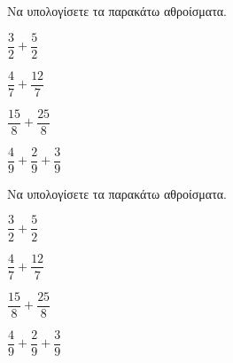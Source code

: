 Να υπολογίσετε τα παρακάτω αθροίσματα.
\begin{multicols}{2}
\begin{rlist}
\item $ \dfrac{3}{2}+\dfrac{5}{2} $
\item $ \dfrac{4}{7}+\dfrac{12}{7} $
\item $ \dfrac{15}{8}+\dfrac{25}{8} $
\item $ \dfrac{4}{9}+\dfrac{2}{9}+\dfrac{3}{9} $
\end{rlist}
\end{multicols}
Να υπολογίσετε τα παρακάτω αθροίσματα.
\begin{multicols}{2}
\begin{rlist}
\item $ \dfrac{3}{2}+\dfrac{5}{2} $
\item $ \dfrac{4}{7}+\dfrac{12}{7} $
\item $ \dfrac{15}{8}+\dfrac{25}{8} $
\item $ \dfrac{4}{9}+\dfrac{2}{9}+\dfrac{3}{9} $
\end{rlist}
\end{multicols}
